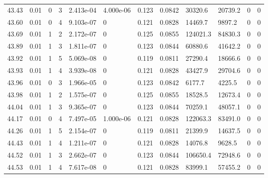 \documentclass[preview]{standalone}
\begin{document}
{{{{{{{{{{{{\begin{tabular}{L{1.2cm}C{1.2cm} C{0.3cm}C{0.5cm} C{1.4cm}C{1.4cm} C{1.4cm}C{1.4cm} C{1.6cm}C{1.6cm} C{1.6cm}C{1.6cm}}
  43.43  &  0.01  & 0     &  3 &  2.413e-04  & 4.000e-06  &  0.123&   0.0842& 30320.6 & 20739.2   &  0 & 0  \\ 
  43.60  &  0.01  & 0     &  4 &  9.103e-07  & 0  &  0.121&   0.0828& 14469.7 & 9897.2   &  0 & 0  \\ 
  43.69  &  0.01  & 1     &  2 &  2.172e-07  & 0  &  0.125&   0.0855& 124021.3 & 84830.3   &  0 & 0  \\ 
  43.89  &  0.01  & 1     &  3 &  1.811e-07  & 0  &  0.123&   0.0844& 60880.6 & 41642.2   &  0 & 0  \\ 
  43.92  &  0.01  & 1     &  5 &  5.069e-08  & 0  &  0.119&   0.0811& 27290.4 & 18666.6   &  0 & 0  \\ 
  43.93  &  0.01  & 1     &  4 &  3.939e-08  & 0  &  0.121&   0.0828& 43427.9 & 29704.6   &  0 & 0  \\ 
  43.96  &  0.01  & 0     &  3 &  1.966e-05  & 0  &  0.123&   0.0842& 6177.7 & 4225.5   &  0 & 0  \\ 
  43.98  &  0.01  & 1     &  2 &  1.575e-07  & 0  &  0.125&   0.0855& 18528.5 & 12673.4   &  0 & 0  \\ 
  44.04  &  0.01  & 1     &  3 &  9.365e-07  & 0  &  0.123&   0.0844& 70259.1 & 48057.1   &  0 & 0  \\ 
  44.17  &  0.01  & 0     &  4 &  7.497e-05  & 1.000e-06  &  0.121&   0.0828& 122063.3 & 83491.0   &  0 & 0  \\ 
  44.26  &  0.01  & 1     &  5 &  2.154e-07  & 0  &  0.119&   0.0811& 21399.9 & 14637.5   &  0 & 0  \\ 
  44.43  &  0.01  & 1     &  4 &  1.211e-07  & 0  &  0.121&   0.0828& 14076.8 & 9628.5   &  0 & 0  \\ 
  44.52  &  0.01  & 1     &  3 &  2.662e-07  & 0  &  0.123&   0.0844& 106650.4 & 72948.6   &  0 & 0  \\ 
  44.53  &  0.01  & 1     &  4 &  7.617e-08  & 0  &  0.121&   0.0828& 83999.1 & 57455.2   &  0 & 0  \\ 
\hline 
\end{tabular} 

}}}}}}}}}}}}
\end{document}
